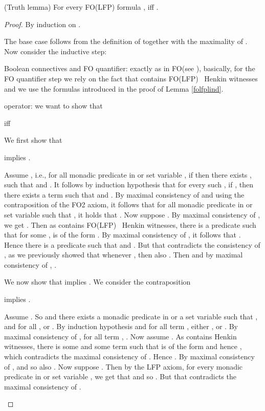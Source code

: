 \documentclass{LMCS}
\newcommand{\fo}{\textsf{FO}\xspace}
\newcommand{\folfp}{\textsf{FO(LFP)}\xspace}
\begin{document}
\begin{lem}(Truth lemma) For every \folfp formula ,  iff .
\end{lem}
\begin{proof}
By induction on .

The base case follows from the definition of  together with the maximality of .
Now consider the inductive step:
\begin{iteMize}{}
\item   Boolean connectives and FO quantifier: exactly as in \fo (see
  \cite[page 138]{Enderton}), basically, for the \fo quantifier step we rely on the fact that  contains \folfp~ Henkin witnesses and we use the  formulas introduced in the proof of Lemma \ref{folfplind}.
\item    operator: we want to show that
\begin{center}

 iff

\end{center}
\begin{iteMize}{}
\item   We first show that
\begin{center}
 implies
    .
    \end{center}
    Assume , i.e., for all monadic predicate in  or set variable ,
    if  then there exists , such that  and
    . It follows by induction hypothesis that
    for every such , if , then there exists a term  such that  and
    . By maximal consistency of  and using the contraposition of the FO2 axiom, it follows that  
    for all monadic predicate in  or set variable  such that , it holds that
    .
    Now suppose . By maximal consistency of , we get .
    Then as  contains \folfp~ Henkin witnesses, there is a predicate  such that for some ,  is of the form . By maximal consistency of , it follows that . Hence there is a predicate  such that  and . But that contradicts the consistency of
    , as we previously showed that whenever , then also  . Then  and by maximal consistency of , .
\item   We now show that  implies
    . We consider the contraposition
      \begin{center}
       implies
    .
    \end{center}
    Assume . So  and there exists a monadic predicate in  or a set variable  such that ,  and
    for all ,  or . By induction hypothesis  and for all term , either , or . By maximal consistency of , for all term ,
    . Now assume . As  contains Henkin witnesses, there is some  and some term  such that  is of the  form  and hence , which contradicts the maximal consistency of . Hence .
 By maximal consistency of ,  and so also . Now suppose . Then by the LFP axiom,
    for every monadic predicate  in  or set variable , we get that  and so . But that
    contradicts the maximal consistency of . 
   \end{iteMize}
\end{iteMize}
\end{proof}
\end{document}
